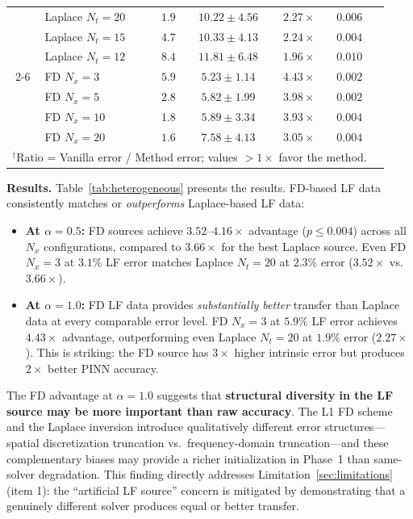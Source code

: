 \documentclass[preprint,12pt]{elsarticle}
\begin{document}
\begin{table}[t]
\begin{tabular}{clccccc}
& Laplace $N_t{=}20$ & $1.9$ & $10.22 \pm 4.56$  & $2.27\times$ & $0.006$ \\
& Laplace $N_t{=}15$ & $4.7$ & $10.33 \pm 4.13$  & $2.24\times$ & $0.004$ \\
& Laplace $N_t{=}12$ & $8.4$ & $11.81 \pm 6.48$  & $1.96\times$ & $0.010$ \\
\cmidrule{2-6}
& FD $N_x{=}3$  & $5.9$ & $\mathbf{5.23 \pm 1.14}$   & $\mathbf{4.43\times}$ & $0.002$ \\
& FD $N_x{=}5$  & $2.8$ & $5.82 \pm 1.99$   & $3.98\times$ & $0.002$ \\
& FD $N_x{=}10$ & $1.8$ & $5.89 \pm 3.34$   & $3.93\times$ & $0.004$ \\
& FD $N_x{=}20$ & $1.6$ & $7.58 \pm 4.13$   & $3.05\times$ & $0.004$ \\
\bottomrule
\multicolumn{6}{l}{\small $^\dagger$Ratio = Vanilla error / Method error; values $>1\times$ favor the method.} \\
\end{tabular}
\end{table}

\textbf{Results.} Table~\ref{tab:heterogeneous} presents the results. FD-based LF data consistently matches or \emph{outperforms} Laplace-based LF data:

\begin{itemize}
\item \textbf{At $\alpha = 0.5$:} FD sources achieve $3.52$--$4.16\times$ advantage ($p \leq 0.004$) across all $N_x$ configurations, compared to $3.66\times$ for the best Laplace source. Even FD $N_x{=}3$ at $3.1\%$ LF error matches Laplace $N_t{=}20$ at $2.3\%$ error ($3.52\times$ vs.\ $3.66\times$).
\item \textbf{At $\alpha = 1.0$:} FD LF data provides \emph{substantially better} transfer than Laplace data at every comparable error level. FD $N_x{=}3$ at $5.9\%$ LF error achieves $4.43\times$ advantage, outperforming even Laplace $N_t{=}20$ at $1.9\%$ error ($2.27\times$). This is striking: the FD source has $3\times$ higher intrinsic error but produces $2\times$ better PINN accuracy.
\end{itemize}

The FD advantage at $\alpha = 1.0$ suggests that \textbf{structural diversity in the LF source may be more important than raw accuracy}. The L1 FD scheme and the Laplace inversion introduce qualitatively different error structures---spatial discretization truncation vs.\ frequency-domain truncation---and these complementary biases may provide a richer initialization in Phase~1 than same-solver degradation. This finding directly addresses Limitation~\ref{sec:limitations} (item 1): the ``artificial LF source'' concern is mitigated by demonstrating that a genuinely different solver produces equal or better transfer.
\end{document}
